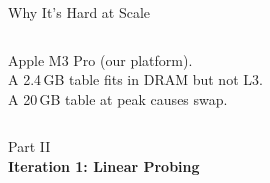 \documentclass[aspectratio=169,t]{beamer}
\begin{document}
\begin{frame}{Why It's Hard at Scale}
\begin{columns}[c]
\vspace{0.2cm}
{\small Apple M3 Pro (our platform).\\
A 2.4\,GB table fits in DRAM but not L3.\\
A 20\,GB table at peak causes swap.}
\end{columns}
\end{frame}

{
\begin{frame}[plain]
  \vspace{2cm}
  \begin{center}
    {\color{lightblue}\small Part II}\\[0.4cm]
    {\color{white}\LARGE\bfseries Iteration 1: Linear Probing}
  \end{center}
\end{frame}
}
\end{document}

